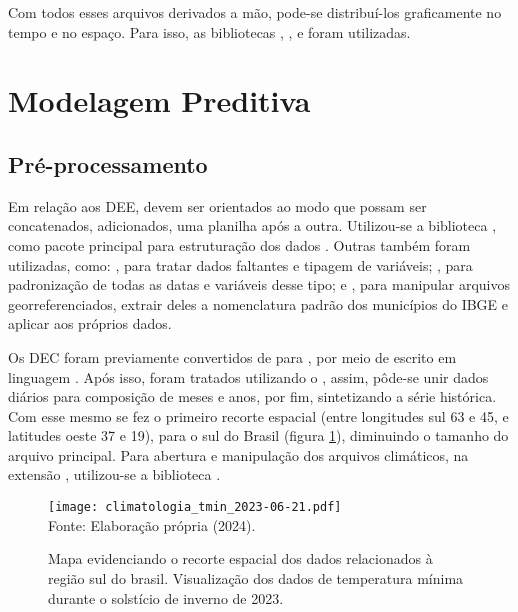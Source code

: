 \indent Com todos esses arquivos derivados a mão, pode-se distribuí-los graficamente no tempo e no espaço. Para isso, as bibliotecas ,  \cite{seaborn_2021_waskom},  e  \cite{geopandas_2020_kelseyjordahl} foram utilizadas.

\section{Modelagem Preditiva}

\subsection{Pré-processamento}

Em relação aos \acrshort{DEE}, devem ser orientados ao modo que possam ser concatenados, adicionados, uma planilha após a outra. Utilizou-se a biblioteca , como pacote principal para estruturação dos dados . Outras também foram utilizadas, como: , para tratar dados faltantes e tipagem de variáveis;  \cite{python2_1995_van}, para padronização de todas as datas e variáveis desse tipo; e , para manipular arquivos georreferenciados, extrair deles a nomenclatura padrão dos municípios do \acrshort{IBGE} e aplicar aos próprios dados.

\indent Os \acrshort{DEC} foram previamente convertidos de  para , por meio de  escrito em linguagem  \cite{shell_1999_heroldlinux, bash_2007_gnu-free}. Após isso, foram tratados utilizando o  \cite{CDO_2023_schulzweida}, assim, pôde-se unir dados diários para composição de meses e anos, por fim, sintetizando a série histórica. Com esse mesmo  se fez o primeiro recorte espacial (entre longitudes sul 63 e 45, e latitudes oeste 37 e 19), para o sul do Brasil (figura \ref{fig: sul_brasil}), diminuindo o tamanho do arquivo principal. Para abertura e manipulação dos arquivos climáticos, na extensão , utilizou-se a biblioteca  \cite{xarray_2016_v0_8_0, xarray_2017_hoyer}.

\begin{figure}[htbp]
    \centering
    \caption{Mapa evidenciando o recorte espacial dos dados relacionados à região sul do brasil. Visualização dos dados de temperatura mínima durante o solstício de inverno de 2023.}
    \texttt{[image: climatologia\_tmin\_2023-06-21.pdf]}
    \label{fig: sul_brasil}
    \\
    \vspace{-0.05cm}\hspace{-7.5cm}\small{Fonte: Elaboração própria (2024).} 
\end{figure}

